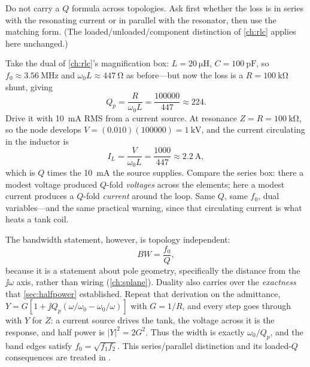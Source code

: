 \begin{mistakebox}
Do not carry a \(Q\) formula across topologies. Ask first whether the loss is in
series with the resonating current or in parallel with the resonator, then use the
matching form. (The loaded/unloaded/component distinction of \cref{ch:rlc} applies
here unchanged.)
\end{mistakebox}

\begin{workedbox}
Take the dual of \cref{ch:rlc}'s magnification box: \(L=\SI{20}{\micro\henry}\),
\(C=\SI{100}{\pico\farad}\), so \(f_0\approx\SI{3.56}{\mega\hertz}\) and
\(\omega_0L\approx\SI{447}{\ohm}\) as before---but now the loss is a
\(R=\SI{100}{\kilo\ohm}\) shunt, giving
\[
Q_p=\frac{R}{\omega_0L}=\frac{100000}{447}\approx224 .
\]
Drive it with \SI{10}{\milli\ampere} RMS from a current source. At resonance
\(Z=R=\SI{100}{\kilo\ohm}\), so the node develops
\(V=(0.010)(100000)=\SI{1}{\kilo\volt}\), and the current circulating in the
inductor is
\[
I_L=\frac{V}{\omega_0L}=\frac{1000}{447}\approx\SI{2.2}{\ampere},
\]
which is \(Q\) times the \SI{10}{\milli\ampere} the source supplies. Compare the
series box: there a modest voltage produced \(Q\)-fold \emph{voltages} across the
elements; here a modest current produces a \(Q\)-fold \emph{current} around the
loop. Same \(Q\), same \(f_0\), dual variables---and the same practical warning,
since that circulating current is what heats a tank coil.
\end{workedbox}

The bandwidth statement, however, is topology independent:
\[
BW=\frac{f_0}{Q},
\]
because it is a statement about pole geometry, specifically the distance from the
\(\jj\omega\) axis, rather than wiring (\cref{ch:splane}). Duality also carries over
the \emph{exactness} that \cref{sec:halfpower} established. Repeat that derivation on
the admittance,
\(Y=G\left[1+\jj Q_p(\omega/\omega_0-\omega_0/\omega)\right]\) with \(G=1/R\), and
every step goes through with \(Y\) for \(Z\): a current source drives the tank, the
voltage across it is the response, and half power is \(|Y|^2=2G^2\). Thus the width
is exactly \(\omega_0/Q_p\), and the band edges satisfy \(f_0=\sqrt{f_1f_2}\).
This series/parallel distinction and its loaded-\(Q\) consequences are treated in
\cite[pp.~23--35]{bowick2008rfcircuit}.

